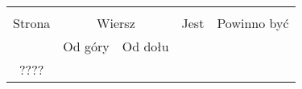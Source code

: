 \documentclass[a4paper,11pt]{article}
\begin{document}
\begin{center}

  \begin{tabular}{|c|c|c|c|c|}
    \hline
    & \multicolumn{2}{c|}{} & & \\
    Strona & \multicolumn{2}{c|}{Wiersz} & Jest
                              & Powinno być \\ \cline{2-3}
    & Od góry & Od dołu & & \\
    \hline
    ????
    \hline
  \end{tabular}






\end{center}
\end{document}
